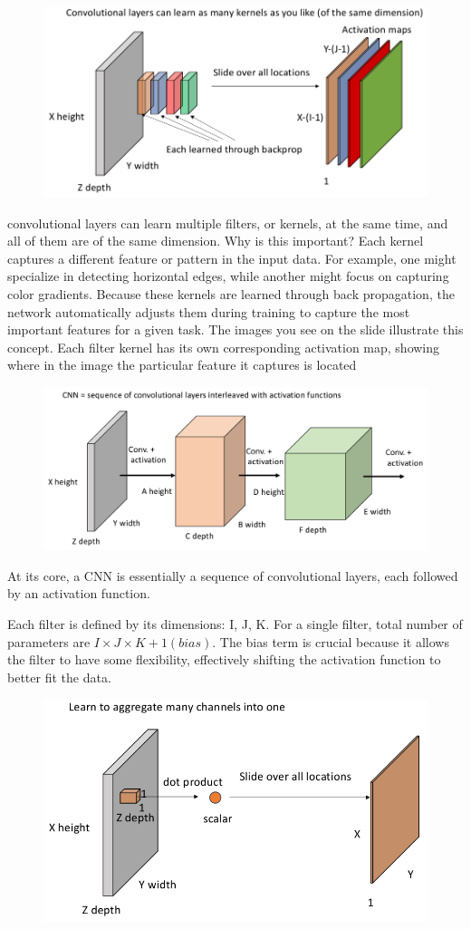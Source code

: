\documentclass[11pt]{article}
\begin{document}
\begin{figure}[H]
    \centering
    \includegraphics[width=.6\linewidth]{figures/features.png}
\end{figure}

convolutional layers can learn multiple filters, or kernels, at the same time, and all of them are of the same dimension. Why is this important? Each kernel captures a different feature or pattern in the input data. For example, one might specialize in detecting horizontal edges, while another might focus on capturing color gradients. Because these kernels are learned through back propagation, the network automatically adjusts them during training to capture the most important features for a given task. The images you see on the slide illustrate this concept. Each filter kernel has its own corresponding activation map, showing where in the image the particular feature it captures is located

\begin{figure}[H]
    \centering
    \includegraphics[width=.6\linewidth]{figures/CNN.png}
\end{figure}

At its core, a CNN is essentially a sequence of convolutional layers, each followed by an activation function. 

Each filter is defined by its dimensions: I, J, K. For a single filter, total number of parameters are $I\times J\times K + 1 (bias)$. The bias term is crucial because it allows the filter to have some flexibility, effectively shifting the activation function to better fit the data.

\begin{figure}[H]
    \centering
    \includegraphics[width=.6\linewidth]{figures/reduction.png}
\end{figure}
\end{document}
